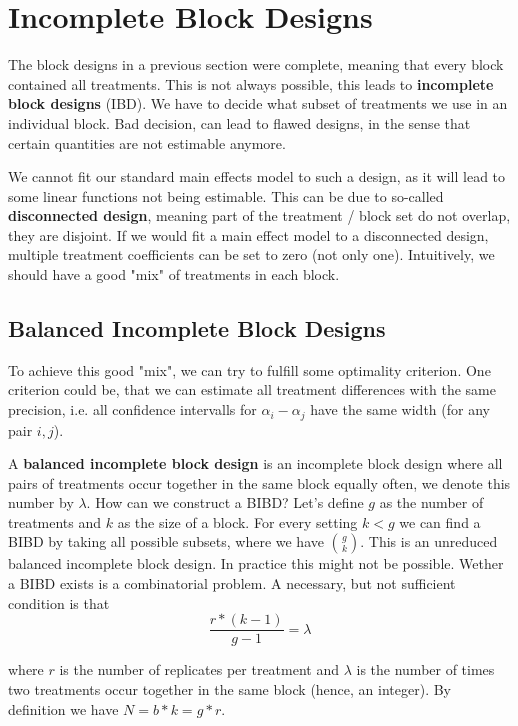 \section{Incomplete Block Designs}

The block designs in a previous section were complete, meaning that every block contained all treatments. This is not always possible, this leads to \textbf{incomplete block designs} (IBD). We have to decide what subset of treatments we use in an individual block. Bad decision, can lead to flawed designs, in the sense that certain quantities are not estimable anymore. \medskip

We cannot fit our standard main effects model to such a design, as it will lead to some linear functions not being estimable. This can be due to so-called \textbf{disconnected design}, meaning part of the treatment / block set do not overlap, they are disjoint. If we would fit a main effect model to a disconnected design, multiple treatment coefficients can be set to zero (not only one). Intuitively, we should have a good "mix" of treatments in each block.\medskip


\subsection{Balanced Incomplete Block Designs}

To achieve this good "mix",  we can try to fulfill some optimality criterion. One criterion could be, that we can estimate all treatment differences with the same precision, i.e. all confidence intervalls for $\alpha_i - \alpha_j$ have the same width (for any pair $i,j$).\medskip

A \textbf{balanced incomplete block design} is an incomplete block design where all pairs of treatments occur together in the same block equally often, we denote this number by $\lambda$.  How can we construct a BIBD? Let's define $g$ as the number of treatments and $k$ as the size of a block. For every setting $k < g$ we can find a BIBD by taking all possible subsets, where we have $\binom{g}{k}$. This is an unreduced balanced incomplete block design. In practice this might not be possible. Wether a BIBD exists is a combinatorial problem. A necessary, but not sufficient condition is that 
$$\frac{r * (k - 1)}{g - 1} = \lambda$$

where $r$ is the number of replicates per treatment and $\lambda$ is the number of times two treatments occur together in the same block (hence, an integer). By definition we have $N = b * k = g * r$.

